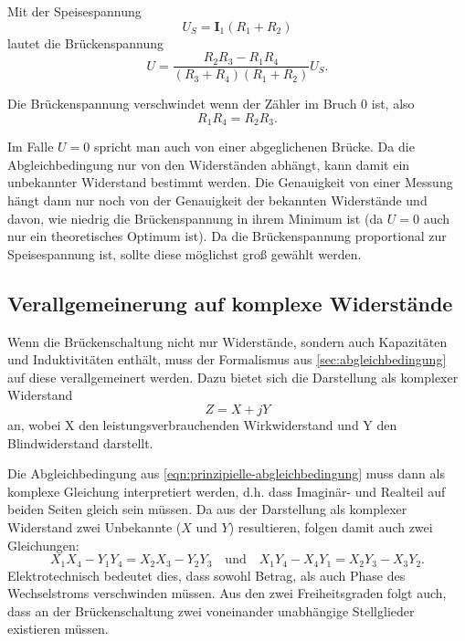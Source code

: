 Mit der Speisespannung
\begin{equation}
	U_S = \mathbf{I}_1 (R_1 + R_2)
	\label{eqn:speisespannung}
\end{equation}
lautet die Brückenspannung
\begin{equation}
	U = \frac{R_2 R_3 - R_1 R_4}{(R_3 + R_4)(R_1 + R_2)} U_S.
	\label{eqn:brueckenspannung-unabhaengig}
\end{equation}

Die Brückenspannung verschwindet wenn der Zähler im Bruch 0 ist, also
\begin{equation}
	R_1R_4 = R_2R_3.
	\label{eqn:prinzipielle-abgleichbedingung}
\end{equation}

Im Falle $U=0$ spricht man auch von einer abgeglichenen Brücke. Da die 
Abgleichbedingung nur von den Widerständen abhängt, kann damit ein unbekannter Widerstand
bestimmt werden. Die Genauigkeit von einer Messung hängt dann nur noch von der Genauigkeit
der bekannten Widerstände und davon, wie niedrig die Brückenspannung in ihrem Minimum ist
(da $U=0$ auch nur ein theoretisches Optimum ist).
Da die Brückenspannung proportional zur Speisespannung ist, sollte diese möglichst
groß gewählt werden.

\subsection{Verallgemeinerung auf komplexe Widerstände}
\label{sec:komplexe-widerstände}
Wenn die Brückenschaltung nicht nur Widerstände, sondern auch Kapazitäten und Induktivitäten
enthält, muss der Formalismus aus \autoref{sec:abgleichbedingung} auf diese verallgemeinert
werden. Dazu bietet sich die Darstellung als komplexer Widerstand
\begin{equation}
	Z = X + jY
	\label{eqn:komplexer-widerstand}
\end{equation}
an, wobei X den leistungsverbrauchenden Wirkwiderstand und Y den Blindwiderstand darstellt.

Die Abgleichbedingung aus \autoref{eqn:prinzipielle-abgleichbedingung} muss dann als komplexe
Gleichung interpretiert werden, d.h. dass Imaginär- und Realteil auf beiden Seiten gleich sein
müssen. Da aus der Darstellung als komplexer Widerstand zwei Unbekannte ($X$ und $Y$) resultieren,
folgen damit auch zwei Gleichungen:
\begin{equation}
	X_1X_4 - Y_1Y_4 = X_2X_3 - Y_2Y_3 
	\quad \text{und} \quad
	X_1Y_4 - X_4Y_1 = X_2Y_3 - X_3Y_2.
	\label{eqn:komplexe-abgleichbedingung}
\end{equation}
Elektrotechnisch bedeutet dies, dass sowohl Betrag, als auch Phase des Wechselstroms verschwinden
müssen. Aus den zwei Freiheitsgraden folgt auch, dass an der Brückenschaltung zwei voneinander
unabhängige Stellglieder existieren müssen.

